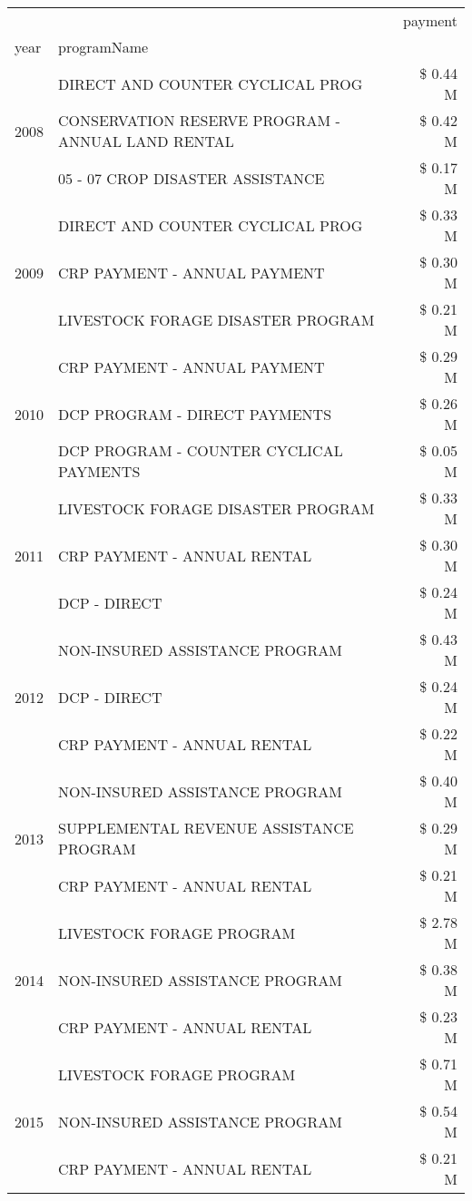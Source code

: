 \begin{tabular}{llr}
\toprule
 &  & payment \\
year & programName &  \\
\midrule
\multirow[t]{3}{*}{2008} & DIRECT AND COUNTER CYCLICAL PROG & \$ 0.44 M \\
 & CONSERVATION RESERVE PROGRAM - ANNUAL LAND RENTAL & \$ 0.42 M \\
 & 05 - 07 CROP DISASTER ASSISTANCE & \$ 0.17 M \\
\cline{1-3}
\multirow[t]{3}{*}{2009} & DIRECT AND COUNTER CYCLICAL PROG & \$ 0.33 M \\
 & CRP PAYMENT - ANNUAL PAYMENT & \$ 0.30 M \\
 & LIVESTOCK FORAGE DISASTER  PROGRAM & \$ 0.21 M \\
\cline{1-3}
\multirow[t]{3}{*}{2010} & CRP PAYMENT - ANNUAL PAYMENT & \$ 0.29 M \\
 & DCP PROGRAM - DIRECT PAYMENTS & \$ 0.26 M \\
 & DCP PROGRAM - COUNTER CYCLICAL PAYMENTS & \$ 0.05 M \\
\cline{1-3}
\multirow[t]{3}{*}{2011} & LIVESTOCK FORAGE DISASTER PROGRAM & \$ 0.33 M \\
 & CRP PAYMENT - ANNUAL RENTAL & \$ 0.30 M \\
 & DCP - DIRECT & \$ 0.24 M \\
\cline{1-3}
\multirow[t]{3}{*}{2012} & NON-INSURED ASSISTANCE PROGRAM & \$ 0.43 M \\
 & DCP - DIRECT & \$ 0.24 M \\
 & CRP PAYMENT - ANNUAL RENTAL & \$ 0.22 M \\
\cline{1-3}
\multirow[t]{3}{*}{2013} & NON-INSURED ASSISTANCE PROGRAM & \$ 0.40 M \\
 & SUPPLEMENTAL REVENUE ASSISTANCE PROGRAM & \$ 0.29 M \\
 & CRP PAYMENT - ANNUAL RENTAL & \$ 0.21 M \\
\cline{1-3}
\multirow[t]{3}{*}{2014} & LIVESTOCK FORAGE PROGRAM & \$ 2.78 M \\
 & NON-INSURED ASSISTANCE PROGRAM & \$ 0.38 M \\
 & CRP PAYMENT - ANNUAL RENTAL & \$ 0.23 M \\
\cline{1-3}
\multirow[t]{3}{*}{2015} & LIVESTOCK FORAGE PROGRAM & \$ 0.71 M \\
 & NON-INSURED ASSISTANCE PROGRAM & \$ 0.54 M \\
 & CRP PAYMENT - ANNUAL RENTAL & \$ 0.21 M \\
\cline{1-3}

\end{tabular}
